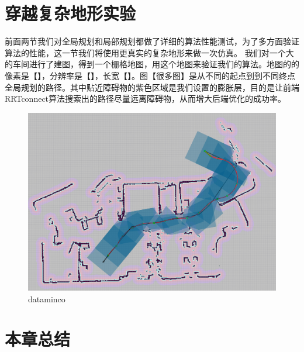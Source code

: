 \documentclass[master,academic]{ysuthesis} %
\begin{document}
	\section{穿越复杂地形实验}
	前面两节我们对全局规划和局部规划都做了详细的算法性能测试，为了多方面验证算法的性能，这一节我们将使用更真实的复杂地形来做一次仿真。
	我们对一个大的车间进行了建图，得到一个栅格地图，用这个地图来验证我们的算法。地图的的像素是【】，分辨率是【】，长宽【】。图【很多图】是从不同的起点到到不同终点全局规划的路径。其中贴近障碍物的紫色区域是我们设置的膨胀层，目的是让前端RRTconnect算法搜索出的路径尽量远离障碍物，从而增大后端优化的成功率。

	\begin{figure}[!ht]
		\centering
		\includegraphics[width=1\textwidth]{dataminco.png}
		\caption{dataminco}
		\label{fig:dataminco}
	\end{figure}

	\section{本章总结}
																					  

\end{document}
